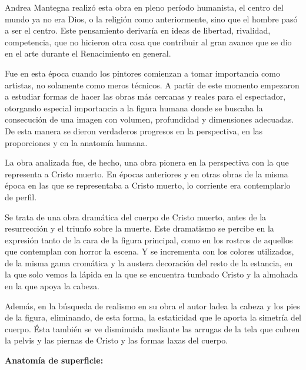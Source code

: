 Andrea Mantegna realizó esta obra en pleno período humanista, el centro del mundo ya no era Dios, o la religión como anteriormente, sino que el hombre pasó a ser el centro. Este pensamiento derivaría en ideas de libertad, rivalidad, competencia, que no hicieron otra cosa que contribuir al gran avance que se dio en el arte durante el Renacimiento en general.

Fue en esta época cuando los pintores comienzan a tomar importancia como artistas, no solamente como meros técnicos. A partir de este momento empezaron a estudiar formas de hacer las obras más cercanas y reales para el espectador, otorgando especial importancia a la figura humana donde se buscaba la consecución de una imagen con volumen, profundidad y dimensiones adecuadas. De esta manera se dieron verdaderos progresos en la perspectiva, en las proporciones y en la anatomía humana.

La obra analizada fue, de hecho, una obra pionera en la perspectiva con la que representa a Cristo muerto. En épocas anteriores y en otras obras de la misma época en las que se representaba a Cristo muerto, lo corriente era contemplarlo de perfil.

Se trata de una obra dramática del cuerpo de Cristo muerto, antes de la resurrección y el triunfo sobre la muerte. Este dramatismo se percibe en la expresión tanto de la cara de la figura principal, como en los rostros de aquellos que contemplan con horror la escena. Y se incrementa con los colores utilizados, de la misma gama cromática y la austera decoración del resto de la estancia, en la que solo vemos la lápida en la que se encuentra tumbado Cristo y la almohada en la que apoya la cabeza.

Además, en la búsqueda de realismo en su obra el autor ladea la cabeza y los pies de la figura, eliminando, de esta forma, la estaticidad que le aporta la simetría del cuerpo. Ésta también se ve disminuida mediante las arrugas de la tela que cubren la pelvis y las piernas de Cristo y las formas laxas del cuerpo.



\vspace{12pt}
\textbf{Anatomía de superficie:}

